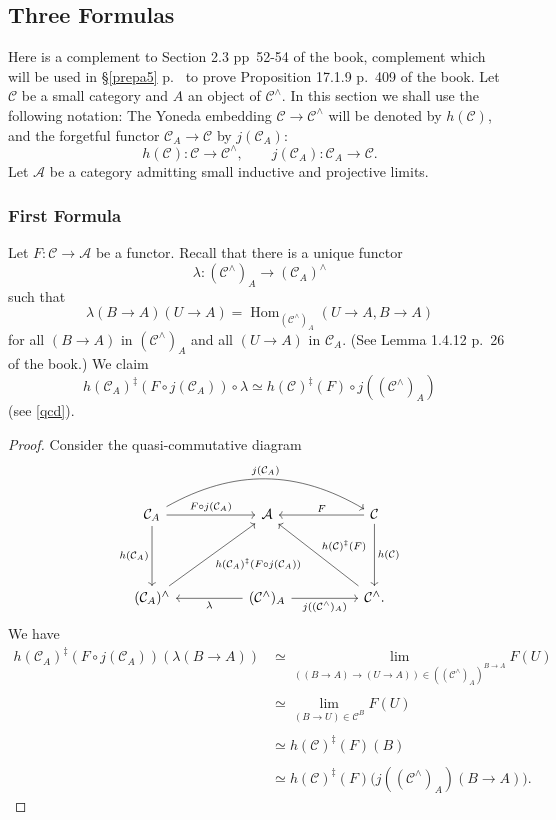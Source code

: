 \documentclass[12pt]{article}%
\theoremstyle{remark}
\theoremstyle{definition}
\newcommand{\A}{\mathcal A}
\newcommand{\C}{\mathcal C}
\DeclareMathOperator{\Hom}{Hom}%
\begin{document}

\subsection{Three Formulas}

Here is a complement to Section 2.3 pp~52-54 of the book, complement which will be used in \S\ref{prepa5} p.~\pageref{prepa5} to prove Proposition 17.1.9 p.~409 of the book. Let $\C$ be a small category and $A$ an object of $\C^\wedge$. In this section we shall use the following notation: The Yoneda embedding $\C\to\C^\wedge$ will be denoted by $h(\C)$, and the forgetful functor $\C_A\to\C$ by $j(\C_A)$: 
$$
h(\C):\C\to\C^\wedge,\qquad j(\C_A):\C_A\to\C.
$$
Let $\A$ be a category admitting small inductive and projective limits. 

\subsubsection{First Formula}

Let $F:\C\to\A$ be a functor. Recall that there is a unique functor 
$$
\lambda:(\C^\wedge)_A\to(\C_A)^\wedge
$$ 
such that 
%
\begin{equation}\label{lambda}
\lambda(B\to A)(U\to A)=\Hom_{(\C^\wedge)_A}(U\to A,B\to A)
\end{equation} 
%
for all $(B\to A)$ in $(\C^\wedge)_A$ and all $(U\to A)$ in $\C_A$. (See Lemma 1.4.12 p.~26 of the book.) We claim 
%
\begin{equation}\label{prepa1}
h(\C_A)^\ddagger(F\circ j(\C_A))\circ\lambda\simeq h(\C)^\ddagger(F)\circ j((\C^\wedge)_A)
\end{equation}
%
(see \eqref{qcd}).

\begin{proof} 
Consider the quasi-commutative diagram 
%
\begin{equation}\label{qcd}
\begin{tikzcd}
\C_A\ar[bend left]{rrrr}{j(\C_A)}\ar{rr}{F\circ j(\C_A)}\ar{dd}[swap]{h(\C_A)}&&\A&&\C\ar{ll}[swap]{F}\ar{dd}{h(\C)}\\ 
{}\\ 
(\C_A)^\wedge\ar{uurr}[swap]{h(\C_A)^\ddagger(F\circ j(\C_A))}&&(\C^\wedge)_A\ar{ll}{\lambda}\ar{rr}[swap]{j((\C^\wedge)_A)}&&\C^\wedge.\ar{uull}[swap]{h(\C)^\ddagger(F)}
\end{tikzcd}
\end{equation}
%
We have 
%
\begin{align*} 
%
h(\C_A)^\ddagger(F\circ j(\C_A))(\lambda(B\to A))&\simeq\lim_{((B\to A)\to(U\to A))\in((\C^\wedge)_A)^{B\to A}}F(U)\\ \\ 
%
&\simeq\lim_{(B\to U)\in\C^B}F(U)\\ \\ 
%
&\simeq h(\C)^\ddagger(F)(B)\\ \\ 
%
&\simeq h(\C)^\ddagger(F)\Big(j((\C^\wedge)_A)(B\to A)\Big). 
% 
\end{align*} 
\end{proof}
\end{document}
